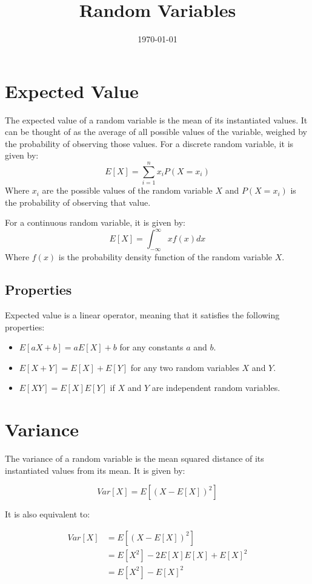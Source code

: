 \documentclass[12pt]{article}
\title{Random Variables}
\date{\today}
\begin{document}
\maketitle

\section{Expected Value}

The expected value of a random variable is the mean of its instantiated values.
It can be thought of as the average of all possible values of the variable, weighed by the probability of observing those values.
For a discrete random variable, it is given by:
$$ E[X] = \sum_{i=1}^{n} x_i P(X=x_i) $$
Where $x_i$ are the possible values of the random variable $X$ and $P(X=x_i)$ is the probability of observing that value.

For a continuous random variable, it is given by:
$$ E[X] = \int_{-\infty}^{\infty} x f(x) dx $$
Where $f(x)$ is the probability density function of the random variable $X$.

\subsection{Properties}

Expected value is a linear operator, meaning that it satisfies the following properties:
\begin{itemize}
    \item $E[aX + b] = aE[X] + b$ for any constants $a$ and $b$.
    \item $E[X + Y] = E[X] + E[Y]$ for any two random variables $X$ and $Y$.
    \item $E[XY] = E[X]E[Y]$ if $X$ and $Y$ are independent random variables.
\end{itemize}

\section{Variance}

The variance of a random variable is the mean squared distance of its instantiated values from its mean.
It is given by:

$$ Var[X] = E[ (X - E[X])^2] $$

It is also equivalent to:

\begin{align*}
    Var[X] &= E[ (X - E[X])^2] \\
    &= E[X^2] - 2 E[X] E[X] + E[X]^2 \\
    &= E[X^2] - E[X]^2
\end{align*}
\end{document}
